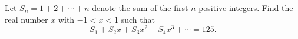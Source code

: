 Let $S_n=1+2+\cdots+n$ denote the sum of the first $n$ positive integers. Find the real number $x$ with $-1<x<1$ such that
\[S_1+S_2x+S_3x^2+S_4x^3+\cdots=125.\]
